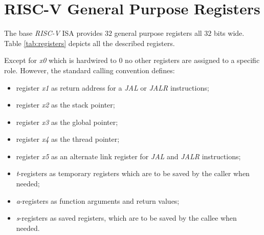 \section{RISC-V General Purpose Registers}
\label{sec:riscv_reg}

The base \textit{RISC-V} ISA provides $32$ general purpose registers all $32$
bits wide. Table \ref{tab:registers} depicts all the described registers.

Except for \textit{x0} which is hardwired to $0$ no other registers are assigned
to a specific role. However, the standard calling convention defines:
\begin{itemize}[noitemsep]
  \item register \textit{x1} as return address for a \textit{JAL} or \textit{JALR}
    instructions;

  \item register \textit{x2} as the stack pointer;

  \item register \textit{x3} as the global pointer;

  \item register \textit{x4} as the thread pointer;

  \item register \textit{x5} as an alternate link register for \textit{JAL} and \textit{JALR}
    instructions;

  \item \textit{t}-registers as temporary registers which are to be saved by the
    caller when needed;

  \item \textit{a}-registers as function arguments and return values;

  \item \textit{s}-registers as saved registers, which are to be saved by the callee
    when needed.
\end{itemize}

